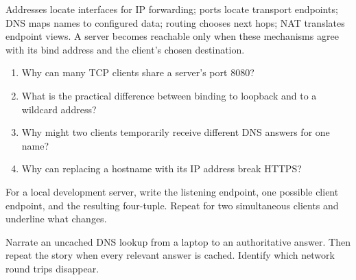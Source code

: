 \summarytitle

Addresses locate interfaces for IP forwarding; ports locate transport endpoints;
DNS maps names to configured data; routing chooses next hops; NAT translates
endpoint views. A server becomes reachable only when these mechanisms agree
with its bind address and the client's chosen destination.

\reviewtitle
\begin{enumerate}
  \item Why can many TCP clients share a server's port 8080?
  \item What is the practical difference between binding to loopback and to a wildcard address?
  \item Why might two clients temporarily receive different DNS answers for one name?
  \item Why can replacing a hostname with its IP address break HTTPS?
\end{enumerate}

\begin{exercise}
For a local development server, write the listening endpoint, one possible
client endpoint, and the resulting four-tuple. Repeat for two simultaneous
clients and underline what changes.
\end{exercise}

\begin{exercise}
Narrate an uncached DNS lookup from a laptop to an authoritative answer. Then
repeat the story when every relevant answer is cached. Identify which network
round trips disappear.
\end{exercise}

